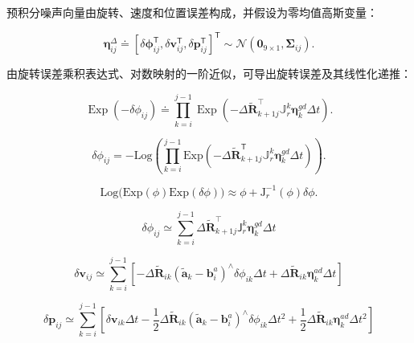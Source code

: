 预积分噪声向量由旋转、速度和位置误差构成，并假设为零均值高斯变量：

\begin{equation}
\boldsymbol {\eta} _ {i j} ^ {\Delta} \doteq [ \delta \boldsymbol {\phi} _ {i j} ^ {\mathsf {T}}, \delta \boldsymbol {v} _ {i j} ^ {\mathsf {T}}, \delta \boldsymbol {p} _ {i j} ^ {\mathsf {T}} ] ^ {\mathsf {T}} \sim \mathcal {N} (\mathbf {0} _ {9 \times 1}, \boldsymbol {\Sigma} _ {i j}).\tag{11.24}
\end{equation}

由旋转误差乘积表达式、对数映射的一阶近似，可导出旋转误差及其线性化递推：

\begin{equation}
\operatorname{Exp} \left(- \delta \phi_ {i j}\right) \doteq \prod_ {k = i} ^ {j - 1} \operatorname{Exp} \left(- \Delta \tilde {\boldsymbol {R}} _ {k + 1 j} ^ {\intercal} \mathbb {J} _ {r} ^ {k} \boldsymbol {\eta} _ {k} ^ {g d} \Delta t\right).\tag{11.25}
\end{equation}

\begin{equation}
\delta \phi_ {i j} = - \mathrm{Log} \left(\prod_ {k = i} ^ {j - 1} \mathrm{Exp} \left(- \Delta \tilde {\boldsymbol {R}} _ {k + 1 j} ^ {\mathsf {T}} \mathbb {J} _ {r} ^ {k}   \boldsymbol {\eta} _ {k} ^ {g d}   \Delta t\right)\right).\tag{11.26}
\end{equation}

\begin{equation}
\mathrm{Log} \big (\mathrm{Exp} (\phi) \mathrm{Exp} (\delta \phi) \big) \approx \phi + \mathrm{J} _ {r} ^ {- 1} (\phi) \delta \phi .\tag{11.27}
\end{equation}

\begin{equation}
\delta \phi_ {i j} \simeq \sum_ {k = i} ^ {j - 1} \Delta \tilde {\boldsymbol {R}} _ {k + 1 j} ^ {\intercal} \mathsf {J} _ {r} ^ {k} \boldsymbol {\eta} _ {k} ^ {g d} \Delta t\tag{11.28}
\end{equation}

\begin{equation}
\delta \boldsymbol {v} _ {i j} \simeq \sum_ {k = i} ^ {j - 1} \left[ - \Delta \tilde {\boldsymbol {R}} _ {i k} \left(\tilde {\mathbf {a}} _ {k} - \mathbf {b} _ {i} ^ {a}\right) ^ {\wedge} \delta \phi_ {i k} \Delta t + \Delta \tilde {\boldsymbol {R}} _ {i k} \boldsymbol {\eta} _ {k} ^ {a d} \Delta t \right]\tag{11.29}
\end{equation}

\begin{equation*}
\delta \pmb {p} _ {i j} \simeq \sum_ {k = i} ^ {j - 1} \left[ \delta \pmb {v} _ {i k} \Delta t - \frac {1}{2} \Delta \tilde {\pmb {R}} _ {i k} (\tilde {\mathbf {a}} _ {k} - \mathbf {b} _ {i} ^ {a}) ^ {\wedge} \delta \phi_ {i k} \Delta t ^ {2} + \frac {1}{2} \Delta \tilde {\pmb {R}} _ {i k} \pmb {\eta} _ {k} ^ {a d} \Delta t ^ {2} \right]
\end{equation*}

